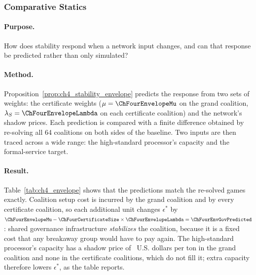 \subsubsection{Comparative Statics}

\paragraph{Purpose.} How does stability respond when a network input changes, and can that response be predicted rather than only simulated?

\paragraph{Method.} Proposition~\ref{prop:ch4_stability_envelope} predicts the response from two sets of weights: the certificate weights ($\mu=\ChFourEnvelopeMu$ on the grand coalition, $\lambda_S=\ChFourEnvelopeLambda$ on each certificate coalition) and the network's shadow prices. Each prediction is compared with a finite difference obtained by re-solving all 64 coalitions on both sides of the baseline. Two inputs are then traced across a wide range: the high-standard processor's capacity and the formal-service target.

\paragraph{Result.} Table~\ref{tab:ch4_envelope} shows that the predictions match the re-solved games exactly. Coalition setup cost is incurred by the grand coalition and by every certificate coalition, so each additional unit changes $\epsilon^*$ by $\ChFourEnvelopeMu-\ChFourCertificateSize\times\ChFourEnvelopeLambda=\ChFourEnvGovPredicted$: shared governance infrastructure \emph{stabilizes} the coalition, because it is a fixed cost that any breakaway group would have to pay again. The high-standard processor's capacity has a shadow price of \ChFourShadowPricePlatform\ U.S. dollars per ton in the grand coalition and none in the certificate coalitions, which do not fill it; extra capacity therefore lowers $\epsilon^*$, as the table reports.

\begin{table}[htbp]
\centering
\caption{Predicted and Re-Solved Responses of Stability}
\label{tab:ch4_envelope}
\end{table}

